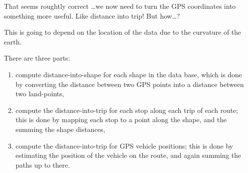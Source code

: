 \documentclass[10pt]{article}\usepackage[]{graphicx}\usepackage[]{color}
\begin{document}
That seems roughtly correct \ldots we now need to turn the GPS coordinates into something more useful.
Like distance into trip!
But how\ldots?

This is going to depend on the location of the data due to the curvature of the earth.

There are three parts:

\begin{enumerate}
\item compute distance-into-shape for each shape in the data base, which is done by
  converting the distance between two GPS points into a distance between two land-points,
  
\item compute the distance-into-trip for each stop along each trip of each route; this is
  done by mapping each stop to a point along the shape, and the summing the shape distances,
  
\item compute the distance-into-trip for GPS vehicle positions; this is done by estimating
  the position of the vehicle on the route, and again summing the paths up to there.
\end{enumerate}
\end{document}
